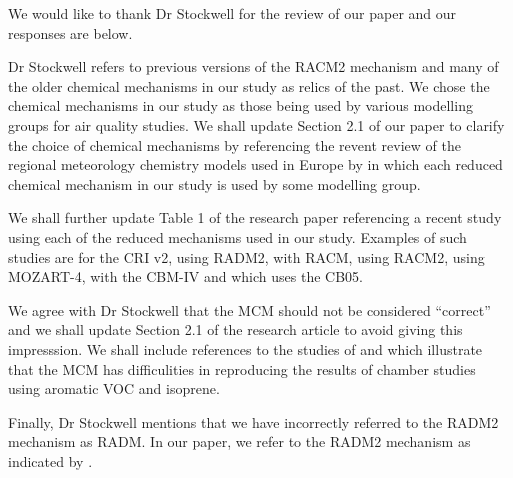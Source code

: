 \documentclass{article}
\begin{document}
We would like to thank Dr Stockwell for the review of our paper and our responses are below.

Dr Stockwell refers to previous versions of the RACM2 mechanism and many of the older chemical mechanisms in our study as relics of the past.
We chose the chemical mechanisms in our study as those being used by various modelling groups for air quality studies.
We shall update Section 2.1 of our paper to clarify the choice of chemical mechanisms by referencing the revent review of the regional meteorology chemistry models used in Europe by \citet{Baklanov:2014} in which each reduced chemical mechanism in our study is used by some modelling group.

We shall further update Table 1 of the research paper referencing a recent study using each of the reduced mechanisms used in our study.
Examples of such studies are \citet{Derwent:2015} for the CRI v2, \citet{Li:2014a} using RADM2, \citet{Ahmadov:2015} with RACM, \citet{Goliff:2015} using RACM2, \citet{Hou:2015} using MOZART-4, \citet{Foster:2014} with the CBM-IV and \citet{Dunker:2015} which uses the CB05.

We agree with Dr Stockwell that the MCM should not be considered ``correct'' and we shall update Section 2.1 of the research article to avoid giving this impresssion.
We shall include references to the studies of \citet{Bloss:2005} and \citet{Pinho:2005} which illustrate that the MCM has difficulities in reproducing the results of chamber studies using aromatic VOC and isoprene.

Finally, Dr Stockwell mentions that we have incorrectly referred to the RADM2 mechanism as RADM.
In our paper, we refer to the RADM2 mechanism as indicated by \citet{Stockwell:1990}.



\end{document}
